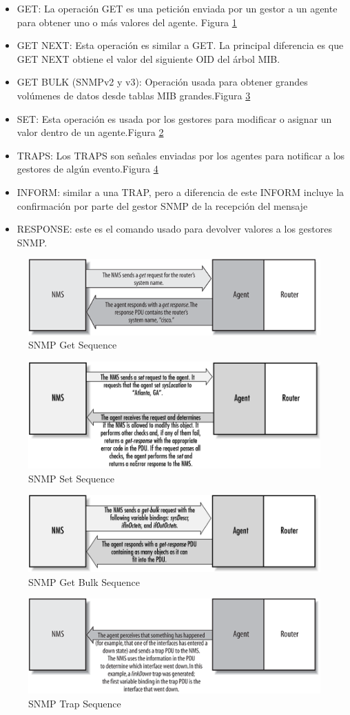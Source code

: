 \begin{itemize}
    \item GET: La operación GET es una petición enviada por un gestor a un agente para obtener uno o
    más valores del agente. Figura \ref{fig:snmp_get}
    \item GET NEXT: Esta operación es similar a GET. La principal diferencia es que GET NEXT obtiene
    el valor del siguiente OID del árbol MIB.
    \item GET BULK (SNMPv2 y v3): Operación usada para obtener grandes volúmenes de datos desde tablas
    MIB grandes.Figura \ref{fig:snmp_bulk}
    \item SET: Esta operación es usada por los gestores para modificar o asignar un valor dentro de un
    agente.Figura \ref{fig:snmp_set}
    \item TRAPS: Los TRAPS son señales enviadas por los agentes para notificar a los gestores de algún
    evento.Figura \ref{fig:snmp_trap}
    \item INFORM: similar a una TRAP, pero a diferencia de este INFORM incluye la confirmación por
    parte del gestor \gls{SNMP} de la recepción del mensaje
    \item RESPONSE: este es el comando usado para devolver valores a los gestores SNMP.
\end{itemize}

\begin{figure}
    \centering
    \includegraphics[width=.5\linewidth]{graphics/snmp_get}
    \caption{SNMP Get Sequence}
    \label{fig:snmp_get}
\end{figure}

\begin{figure}
    \centering
    \includegraphics[width=.5\linewidth]{graphics/snmp_set}
    \caption{SNMP Set Sequence}
    \label{fig:snmp_set}
\end{figure}

\begin{figure}
    \centering
    \includegraphics[width=.5\linewidth]{graphics/snmp_get_bulk}
    \caption{SNMP Get Bulk Sequence}
    \label{fig:snmp_bulk}
\end{figure}

\begin{figure}
    \centering
    \includegraphics[width=.5\linewidth]{graphics/snmp_trap}
    \caption{SNMP Trap Sequence}
    \label{fig:snmp_trap}
\end{figure}